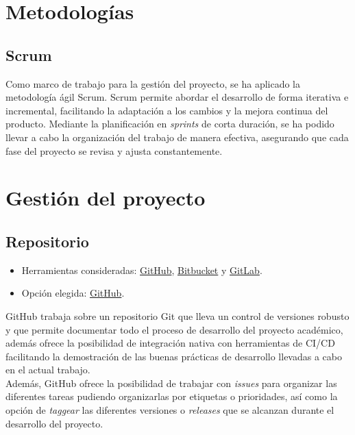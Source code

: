
\section{Metodologías}\label{metodologias}

\subsection{Scrum}\label{scrum}
Como marco de trabajo para la gestión del proyecto, se ha aplicado la metodología ágil Scrum. Scrum permite abordar el desarrollo de forma iterativa e incremental, facilitando la adaptación a los cambios y la mejora continua del producto. Mediante la planificación en \emph{sprints} de corta duración, se ha podido llevar a cabo la organización del trabajo de manera efectiva, asegurando que cada fase del proyecto se revisa y ajusta constantemente.\\

\section{Gestión del proyecto}\label{gestion-del-proyecto}

\subsection{Repositorio}\label{repositorio}

\begin{itemize}
\tightlist
\item
  Herramientas consideradas: \href{https://github.com/}{GitHub},
  \href{https://bitbucket.org/}{Bitbucket} y
  \href{https://gitlab.com/}{GitLab}.
\item
  Opción elegida: \href{https://github.com/}{GitHub}.
\end{itemize}

GitHub trabaja sobre un repositorio Git que lleva un control de versiones robusto y que permite documentar todo el proceso de desarrollo del proyecto académico, además ofrece la posibilidad de integración nativa con herramientas de CI/CD facilitando la demostración de las buenas prácticas de desarrollo llevadas a cabo en el actual trabajo.\\
Además, GitHub ofrece la posibilidad de trabajar con \emph{issues} para organizar las diferentes tareas pudiendo organizarlas por etiquetas o prioridades, así como la opción de \emph{taggear} las diferentes versiones o \emph{releases} que se alcanzan durante el desarrollo del proyecto.

